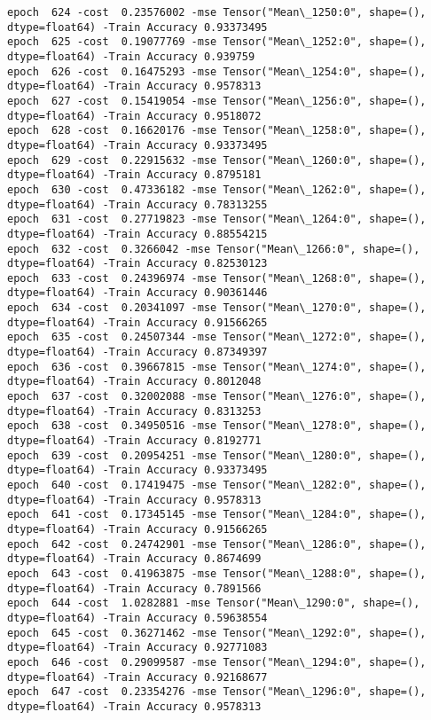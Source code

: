 \documentclass[11pt]{article}
\begin{document}
\begin{Verbatim}[commandchars=\\\{\}]
epoch  624 -cost  0.23576002 -mse Tensor("Mean\_1250:0", shape=(), dtype=float64) -Train Accuracy 0.93373495
epoch  625 -cost  0.19077769 -mse Tensor("Mean\_1252:0", shape=(), dtype=float64) -Train Accuracy 0.939759
epoch  626 -cost  0.16475293 -mse Tensor("Mean\_1254:0", shape=(), dtype=float64) -Train Accuracy 0.9578313
epoch  627 -cost  0.15419054 -mse Tensor("Mean\_1256:0", shape=(), dtype=float64) -Train Accuracy 0.9518072
epoch  628 -cost  0.16620176 -mse Tensor("Mean\_1258:0", shape=(), dtype=float64) -Train Accuracy 0.93373495
epoch  629 -cost  0.22915632 -mse Tensor("Mean\_1260:0", shape=(), dtype=float64) -Train Accuracy 0.8795181
epoch  630 -cost  0.47336182 -mse Tensor("Mean\_1262:0", shape=(), dtype=float64) -Train Accuracy 0.78313255
epoch  631 -cost  0.27719823 -mse Tensor("Mean\_1264:0", shape=(), dtype=float64) -Train Accuracy 0.88554215
epoch  632 -cost  0.3266042 -mse Tensor("Mean\_1266:0", shape=(), dtype=float64) -Train Accuracy 0.82530123
epoch  633 -cost  0.24396974 -mse Tensor("Mean\_1268:0", shape=(), dtype=float64) -Train Accuracy 0.90361446
epoch  634 -cost  0.20341097 -mse Tensor("Mean\_1270:0", shape=(), dtype=float64) -Train Accuracy 0.91566265
epoch  635 -cost  0.24507344 -mse Tensor("Mean\_1272:0", shape=(), dtype=float64) -Train Accuracy 0.87349397
epoch  636 -cost  0.39667815 -mse Tensor("Mean\_1274:0", shape=(), dtype=float64) -Train Accuracy 0.8012048
epoch  637 -cost  0.32002088 -mse Tensor("Mean\_1276:0", shape=(), dtype=float64) -Train Accuracy 0.8313253
epoch  638 -cost  0.34950516 -mse Tensor("Mean\_1278:0", shape=(), dtype=float64) -Train Accuracy 0.8192771
epoch  639 -cost  0.20954251 -mse Tensor("Mean\_1280:0", shape=(), dtype=float64) -Train Accuracy 0.93373495
epoch  640 -cost  0.17419475 -mse Tensor("Mean\_1282:0", shape=(), dtype=float64) -Train Accuracy 0.9578313
epoch  641 -cost  0.17345145 -mse Tensor("Mean\_1284:0", shape=(), dtype=float64) -Train Accuracy 0.91566265
epoch  642 -cost  0.24742901 -mse Tensor("Mean\_1286:0", shape=(), dtype=float64) -Train Accuracy 0.8674699
epoch  643 -cost  0.41963875 -mse Tensor("Mean\_1288:0", shape=(), dtype=float64) -Train Accuracy 0.7891566
epoch  644 -cost  1.0282881 -mse Tensor("Mean\_1290:0", shape=(), dtype=float64) -Train Accuracy 0.59638554
epoch  645 -cost  0.36271462 -mse Tensor("Mean\_1292:0", shape=(), dtype=float64) -Train Accuracy 0.92771083
epoch  646 -cost  0.29099587 -mse Tensor("Mean\_1294:0", shape=(), dtype=float64) -Train Accuracy 0.92168677
epoch  647 -cost  0.23354276 -mse Tensor("Mean\_1296:0", shape=(), dtype=float64) -Train Accuracy 0.9578313

\end{Verbatim}
\end{document}
